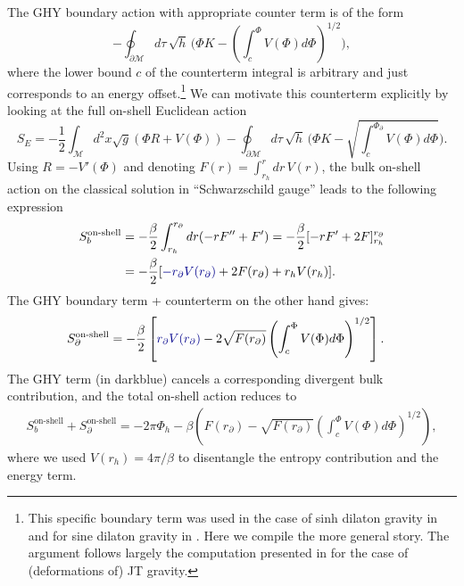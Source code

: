 \documentclass[a4paper,titlepage,12pt]{article}
\numberwithin{equation}{section}
\begin{document}
The GHY boundary action with appropriate counter term is of the form
\begin{equation}
- \oint_{\partial \mathcal{M}} d \tau\,\sqrt{h}\,\bigg(\Phi K-\left(\int^{\Phi}_{c} V(\Phi)d\Phi\right)^{1/2} \bigg),
\end{equation}
where the lower bound $c$ of the counterterm integral is arbitrary and just corresponds to an energy offset.\footnote{This specific boundary term was used in the case of sinh dilaton gravity in \cite{Blommaert:2023wad} and for sine dilaton gravity in \cite{Blommaert:2024ymv}. Here we compile the more general story. The argument follows largely the computation presented in \cite{Witten:2020ert} for the case of (deformations of) JT gravity.} We can motivate this counterterm explicitly by looking at the full on-shell Euclidean action
\begin{equation}
S_E = -\frac{1}{2} \int_\mathcal{M} d^2x \sqrt{g}\left(\Phi R + V(\Phi)\right) - \oint_{\partial \mathcal{M}} d \tau\,\sqrt{h}\,\bigg(\Phi K-\sqrt{\int^{\Phi_{\partial}}_c V(\Phi) d\Phi }\bigg).
\end{equation}
Using $R = -V'(\Phi)$ and denoting $F(r) = \int_{r_h}^{r}dr \, V(r)$, the bulk on-shell action on the classical solution in ``Schwarzschild gauge'' leads to the following expression
\begin{align}
S_{b}^{\text{on-shell}} &= -\frac{\beta}{2}\int_{r_h}^{r_{\partial}} dr (-r F''+F') = -\frac{\beta}{2} [-rF'+2F]_{r_h}^{r_\partial} \\
&= -\frac{\beta}{2}[{\color{darkblue}-r_\partial V(r_\partial)} + 2F(r_\partial) +r_h V(r_h)].
\end{align}
The GHY boundary term + counterterm on the other hand gives:
\begin{align}
S_{\partial}^{\text{on-shell}} &= -\frac{\beta}{2} \left[{\color{darkblue}r_{\partial}V(r_\partial)} - 2\sqrt{F(r_\partial)}\left(\int^{\Phi}_{c} V(\Phi)d\Phi\right)^{1/2}\right].
\end{align}
The GHY term (in darkblue) cancels a corresponding divergent bulk contribution, and the total on-shell action reduces to
\begin{align}
S_{b}^{\text{on-shell}} + S_{\partial}^{\text{on-shell}} = -2\pi \Phi_h -\beta \left(F(r_\partial) -\sqrt{F(r_\partial)}\left(\int^{\Phi}_{c} V(\Phi)d\Phi\right)^{1/2}\right),
\end{align}
where we used $V(r_h) = 4\pi/\beta$ to disentangle the entropy contribution and the energy term. 
\end{document}
